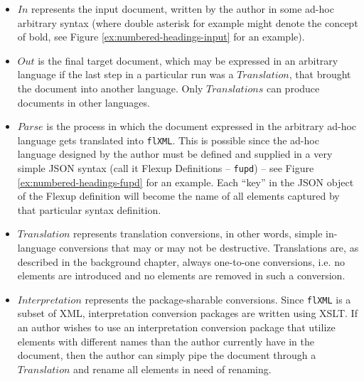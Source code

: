 \documentclass{scrreprt}
\begin{document}
\begin{itemize}

\item $In$ represents the input document, written by the author in some ad-hoc arbitrary syntax (where double asterisk for example might denote the concept of bold, see Figure \ref{ex:numbered-headings-input} for an example).

\item $Out$ is the final target document, which may be expressed in an arbitrary language if the last step in a particular run was a $Translation$, that brought the document into another language. Only $Translations$ can produce documents in other languages.

\item $Parse$ is the process in which the document expressed in the arbitrary ad-hoc language gets translated into \texttt{flXML}. This is possible since the ad-hoc language designed by the author must be defined and supplied in a very simple JSON syntax (call it Flexup Definitions -- \texttt{fupd}) -- see Figure \ref{ex:numbered-headings-fupd} for an example. Each ``key'' in the JSON object of the Flexup definition will become the name of all elements captured by that particular syntax definition.

\item $Translation$ represents translation conversions, in other words, simple in-language conversions that may or may not be destructive. Translations are, as described in the background chapter, always one-to-one conversions, i.e. no elements are introduced and no elements are removed in such a conversion.

\item $Interpretation$ represents the package-sharable conversions. Since \texttt{flXML} is a subset of XML, interpretation conversion packages are written using XSLT. If an author wishes to use an interpretation conversion package that utilize elements with different names than the author currently have in the document, then the author can simply pipe the document through a $Translation$ and rename all elements in need of renaming.

\end{itemize}
\end{document}
